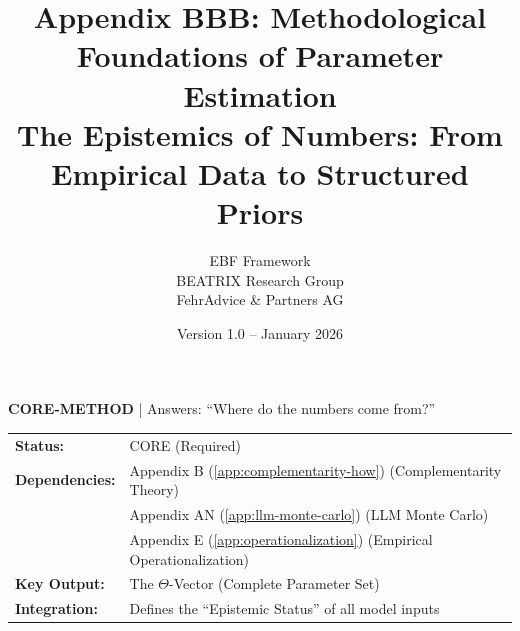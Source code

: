 \documentclass[11pt,a4paper]{article}
\title{Appendix BBB: Methodological Foundations of Parameter Estimation\\
\large The Epistemics of Numbers: From Empirical Data to Structured Priors}
\author{EBF Framework\\BEATRIX Research Group\\FehrAdvice \& Partners AG}
\date{Version 1.0 -- January 2026}
\theoremstyle{definition}
\begin{document}
\maketitle

\begin{tcolorbox}[colback=blue!5!white, colframe=blue!75!black, title=Methodology Appendix]
\textbf{CORE-METHOD} | Answers: ``Where do the numbers come from?''

\begin{tabular}{ll}
\textbf{Status:} & CORE (Required) \\
\textbf{Dependencies:} & Appendix B (\ref{app:complementarity-how}) (Complementarity Theory) \\
 & Appendix AN (\ref{app:llm-monte-carlo}) (LLM Monte Carlo) \\
 & Appendix E (\ref{app:operationalization}) (Empirical Operationalization) \\
\textbf{Key Output:} & The $\Theta$-Vector (Complete Parameter Set) \\
\textbf{Integration:} & Defines the ``Epistemic Status'' of all model inputs \\
\end{tabular}
\end{tcolorbox}

\tableofcontents
\newpage



%
%
%


\end{document}
